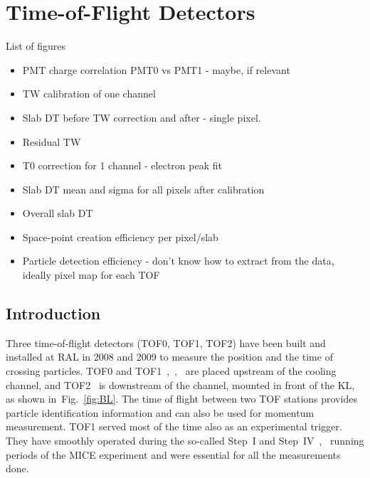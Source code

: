 \graphicspath{{02-TOF/Figures/}}


\newcommand{\mchange}[2]{{\color{red}#1}{\color{green}#2}}
\newcommand{\malert}[1]{{\it\color{red}#1}}


\section{Time-of-Flight Detectors}
\label{Sect:TOF}

List of figures
\begin{itemize}
\item PMT charge correlation PMT0 vs PMT1 - maybe, if relevant
\item TW calibration of one channel
\item Slab DT before TW correction and after - single pixel.
\item Residual TW
\item T0 correction for 1 channel - electron peak fit
\item Slab DT mean and sigma for all pixels after calibration
\item Overall slab DT
\item Space-point creation efficiency per pixel/slab
\item Particle detection efficiency - don't know how to extract from
  the data, ideally pixel map for each TOF
\end{itemize}


\subsection{Introduction}
\label{SubSect:TOF_Intro}

Three time-of-flight detectors (TOF0, TOF1, TOF2) have been built and installed at RAL in 2008 and 2009 to measure the position and the time of crossing particles.
TOF0 and TOF1~\cite{NOTE145},~\cite{NOTE241},~\cite{2010NIMPA.615...14B} are placed upstream of the cooling channel, and TOF2~\cite{NOTE286} is downstream of the channel, mounted in front of the KL, as shown in~Fig.~\ref{fig:BL}.
The time of flight between two TOF stations provides particle identification information and can also be used for momentum measurement. TOF1 served most of the time also as an experimental trigger.
They  have smoothly operated during the so-called Step~I and Step~IV~\cite{Rajaram:2015bra},~\cite{2015ehep.confE.521B} running periods of the MICE experiment and were essential for all the measurements done.


